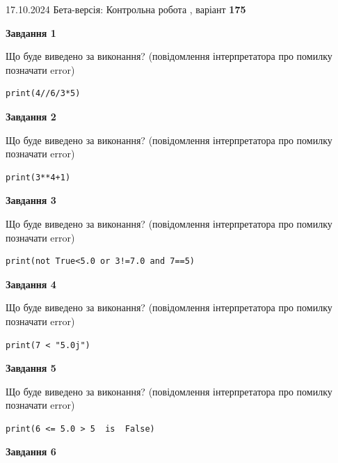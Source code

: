 \documentclass[12pt, ukrainian]{article}
\begin{document}
{\Large{17.10.2024 Бета-версія: Контрольна робота , варіант  \No \textbf { 175 }\par}}
{
\begin {large}
{\begin {center}\textbf{Завдання 1}\end {center}}

Що буде виведено за виконання? (повідомлення інтерпретатора про помилку позначати error)\par
\begin{verbatim}
print(4//6/3*5)
\end{verbatim}

{\begin {center}\textbf{Завдання 2}\end {center}}

Що буде виведено за виконання? (повідомлення інтерпретатора про помилку позначати error)\par
\begin{verbatim}
print(3**4+1)
\end{verbatim}

{\begin {center}\textbf{Завдання 3}\end {center}}

Що буде виведено за виконання? (повідомлення інтерпретатора про помилку позначати error)\par
\begin{verbatim}
print(not True<5.0 or 3!=7.0 and 7==5)
\end{verbatim}

{\begin {center}\textbf{Завдання 4}\end {center}}

Що буде виведено за виконання? (повідомлення інтерпретатора про помилку позначати error)\par
\begin{verbatim}
print(7 < "5.0j")
\end{verbatim}

{\begin {center}\textbf{Завдання 5}\end {center}}

Що буде виведено за виконання? (повідомлення інтерпретатора про помилку позначати error)\par
\begin{verbatim}
print(6 <= 5.0 > 5  is  False)
\end{verbatim}

{\begin {center}\textbf{Завдання 6}\end {center}}


\end{large}}
\end{document}
